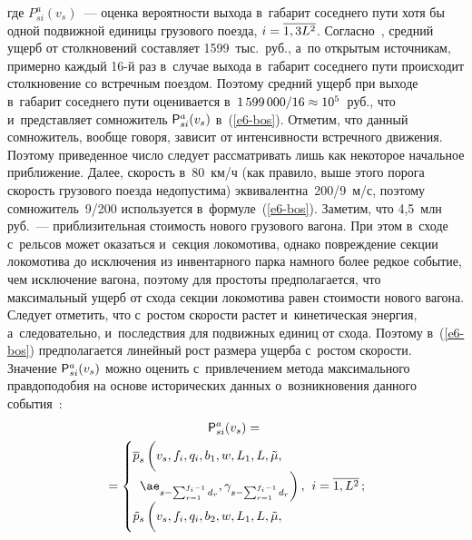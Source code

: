 \begin{multicols}{2}
\noindent
где $P_{si}^a(v_s)$~--- оценка вероятности выхода в~габарит соседнего пути хотя 
бы одной по\-движ\-ной единицы грузового поезда, $i\hm= \overline{1,3L^2}$. 
Согласно~\cite{13-bos}, средний ущерб от столкновений со\-став\-ля\-ет 1599~тыс.\ 
руб., а~по открытым источникам, примерно каж\-дый \mbox{16-й} раз в~случае выхода 
в~габарит соседнего пути происходит столкновение со встреч\-ным поездом. Поэтому 
сред\-ний ущерб при выходе в~габарит соседнего пути оценивается 
в~$1\,599\,000/16\hm\approx 10^5$~руб., что и~пред\-став\-ля\-ет сомножитель 
${\sf P}^a_{si}(v_s)$ в~(\ref{e6-bos}). Отметим, что данный сомножитель, вообще 
говоря, зависит от ин\-тен\-сив\-ности встреч\-но\-го движения. Поэтому приведенное 
чис\-ло следует рас\-смат\-ри\-вать лишь как некоторое начальное при\-бли\-же\-ние. Далее, 
ско\-рость в~80~км/ч (как правило, выше этого порога ско\-рость грузового поезда 
недопустима) эквивалентна~200/9~м/с, поэтому сомножитель~9/200 используется 
в~формуле~(\ref{e6-bos}). Заметим, что 4,5~млн руб.~--- при\-бли\-зи\-тель\-ная 
сто\-и\-мость нового грузового вагона. При этом в~сходе с~рельсов может оказаться 
и~секция локомотива, однако по\-вреж\-де\-ние секции локомотива до исключения из 
инвентарного парка намного более ред\-кое событие, чем исключение вагона, 
поэтому для прос\-то\-ты предполагается, что максимальный ущерб от схода секции 
локомотива равен сто\-и\-мости нового вагона. Следует отметить, что с~рос\-том 
ско\-рости рас\-тет и~кинетическая энергия, а~следовательно, и~по\-след\-ст\-вия для 
по\-движ\-ных единиц от схода. Поэтому в~(\ref{e6-bos}) предполагается линейный 
рост размера ущерба с~рос\-том ско\-рости. Значение ${\sf P}^a_{si}(v_s)$ мож\-но 
оценить с~при\-вле\-че\-ни\-ем метода максимального прав\-до\-по\-до\-бия на основе 
исторических данных о~возникновения данного события~\cite{8-bos}: 
\begin{multline*}
{\sf P}^a_{si}(v_s)= {}\\
{}=\begin{cases}
\overline{p}_s \left( 
\vphantom{\ae_{s-\sum\nolimits_{r=1}^{f_i-1} d_r}}
v_s, f_i, q_i, b_1, w,L_1, L, \tilde{\mu},\right.&\\
 \hspace*{1.5mm}\left.\ae_{s-\sum\nolimits_{r=1}^{f_i-1} d_r}, \gamma_{s-\sum\nolimits_{r=1}^{f_i-1} d_r}\right), &
\hspace*{-1.5mm}i=\overline{1,L^2}\,;\\[3pt]
\tilde{p}_s\left(
\vphantom{\ae_{s-\sum\nolimits_{r=1}^{f_i-1} d_r}}
v_s, f_i, q_i, b_2, w,L_1, L, \tilde{\mu},\right.&\\

\end{cases}
\end{multline*}
\end{multicols}
